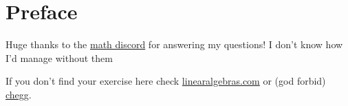 \documentclass[titlepage,12pt]{book}
\begin{document}
\maketitle
\frontmatter

\chapter*{Preface}
Huge thanks to the \href{https://discord.com/invite/math}{math discord} for answering my questions! I don't know how I'd manage without them \heart
\par

If you don't find your exercise here check \href{https://linearalgebras.com/solution-understanding-analysis.html}{linearalgebras.com} or (god forbid) \href{https://www.chegg.com/homework-help/understanding-analysis-2nd-edition-solutions-9781493927111}{chegg}.
\par

\tableofcontents
\mainmatter








\end{document}
